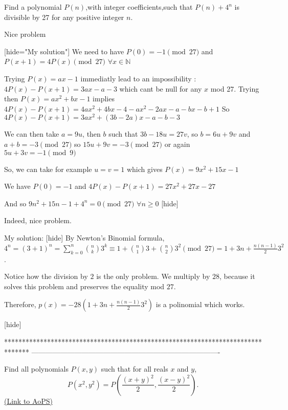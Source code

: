 \begin{solution}
	\begin{tcolorbox}Find a polynomial $ P(n)$,with integer coefficients,such that $ P(n) + 4^n$ is divisible by 27 for any positive integer $ n$.\end{tcolorbox}

Nice problem

[hide="My solution"]
We need to have $ P(0)=-1 \pmod {27}$ and $ P(x+1)=4P(x) \pmod {27}$ $ \forall x\in \mathbb N$

Trying $ P(x)=ax-1$ immediatly lead to an impossibility : $ 4P(x)-P(x+1)=3ax-a-3$ which cant be null for any $ x$ mod 27.
Trying then $ P(x)=ax^2+bx-1$ implies $ 4P(x)-P(x+1)=4ax^2+4bx-4-ax^2-2ax-a-bx-b+1$
So $ 4P(x)-P(x+1)=3ax^2+(3b-2a)x-a-b-3$

We can then take $ a=9u$, then $ b$ such that $ 3b-18u=27v$, so $ b=6u+9v$ and $ a+b=-3\pmod {27}$ so $ 15u+9v=-3\pmod {27}$ or again $ 5u+3v=-1\pmod 9$

So, we can take for example $ u=v=1$ which gives $ P(x)=9x^2+15x-1$

We have $ P(0)=-1$ and $ 4P(x)-P(x+1)=27x^2+27x-27$

And so $ 9n^2+15n-1+4^n=0\pmod {27}$ $ \forall n\geq 0$
[\/hide]
\end{solution}



\begin{solution}
	Indeed, nice problem.

My solution:
[hide]
By Newton's Binomial formula, $4^n=(3+1)^n=\sum_{k=0}^n{\binom{n}{k}3^k}\equiv 1+\binom{n}{1}3+\binom{n}{2}3^2 \pmod{27}=1+3n+\frac{n(n-1)}{2}3^2$.

Notice how the division by $2$ is the only problem. We multiply by $28$, because it solves this problem and preserves the equality mod $27$.

Therefore, $p(x)=-28(1+3n+\frac{n(n-1)}{2}3^2)$ is a polinomial which works.

[\/hide]
\end{solution}
*******************************************************************************
-------------------------------------------------------------------------------

\begin{problem}
	Find all polynomials $ P(x,y)$ such that for all reals $ x$ and $y$,
\[P(x^{2},y^{2}) =P\left(\frac {(x + y)^{2}}{2},\frac {(x - y)^{2}}{2}\right).\]
	\flushright \href{https://artofproblemsolving.com/community/c6h277105}{(Link to AoPS)}
\end{problem}



